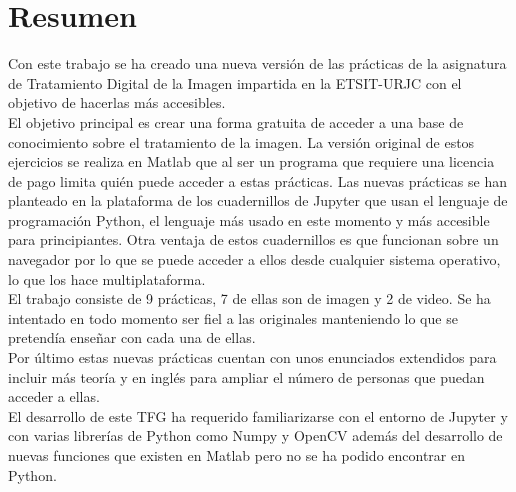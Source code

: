 \chapter*{Resumen}

Con este trabajo se ha creado una nueva versión de las prácticas de la asignatura de Tratamiento Digital de la Imagen impartida en la ETSIT-URJC con el objetivo de hacerlas más accesibles.\\

El objetivo principal es crear una forma gratuita de acceder a una base de conocimiento sobre el tratamiento de la imagen. La versión original de estos ejercicios se realiza en Matlab que al ser un programa que requiere una licencia de pago limita quién puede acceder a estas prácticas. Las nuevas prácticas se han planteado en la plataforma de los cuadernillos de Jupyter que usan el lenguaje de programación Python, el lenguaje más usado en este momento y más accesible para principiantes. Otra ventaja de estos cuadernillos es que funcionan sobre un navegador por lo que se puede acceder a ellos desde cualquier sistema operativo, lo que los hace multiplataforma.\\

El trabajo consiste de 9 prácticas, 7 de ellas son de imagen y 2 de video. Se ha intentado en todo momento ser fiel a las originales manteniendo lo que se pretendía enseñar con cada una de ellas.\\

Por último estas nuevas prácticas cuentan con unos enunciados extendidos para incluir más teoría y en inglés para ampliar el número de personas que puedan acceder a ellas.\\

El desarrollo de este TFG ha requerido familiarizarse con el entorno de Jupyter y con varias librerías de Python como Numpy y OpenCV además del desarrollo de nuevas funciones que existen en Matlab pero no se ha podido encontrar en Python.\\


